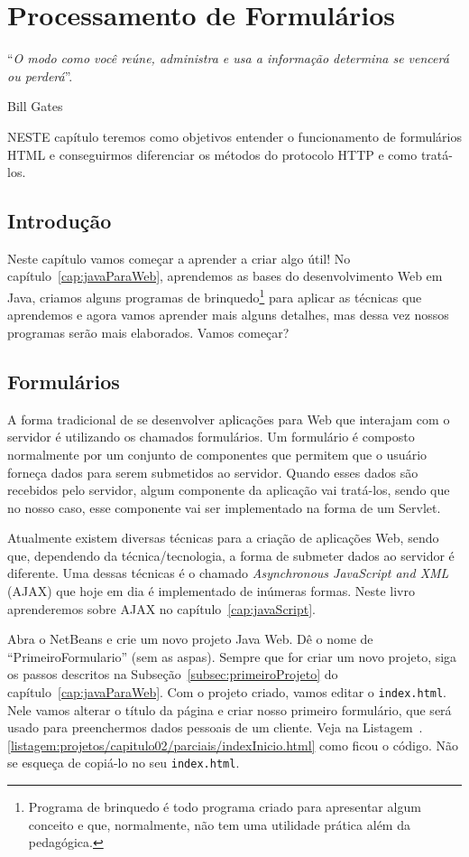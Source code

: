 \chapter{Processamento de Formulários}\label{cap:processamentoFormularios}
\epigraph{``\textit{O modo como você reúne, administra e usa a informação determina se vencerá ou perderá}''.}{Bill Gates}

\lettrine[lines=4, lhang=0.1, lraise=0, loversize=0.2, findent=0.1em]{\textcolor{corTema}{N}}{ESTE} capítulo teremos como objetivos entender o funcionamento de formulários HTML e conseguirmos diferenciar os métodos do protocolo HTTP e como tratá-los.


\section{Introdução}

Neste capítulo vamos começar a aprender a criar algo útil! No capítulo~\ref{cap:javaParaWeb}, aprendemos as bases do desenvolvimento Web em Java, criamos alguns programas de brinquedo\footnote{Programa de brinquedo é todo programa criado para apresentar algum conceito e que, normalmente, não tem uma utilidade prática além da pedagógica.} para aplicar as técnicas que aprendemos e agora vamos aprender mais alguns detalhes, mas dessa vez nossos programas serão mais elaborados. Vamos começar?


\section{Formulários}

A forma tradicional de se desenvolver aplicações para Web que interajam com o servidor é utilizando os chamados formulários. Um formulário é composto normalmente por um conjunto de componentes que permitem que o usuário forneça dados para serem submetidos ao servidor. Quando esses dados são recebidos pelo servidor, algum componente da aplicação vai tratá-los, sendo que no nosso caso, esse componente vai ser implementado na forma de um Servlet.

Atualmente existem diversas técnicas para a criação de aplicações Web, sendo que, dependendo da técnica/tecnologia, a forma de submeter dados ao servidor é diferente. Uma dessas técnicas é o chamado \textit{Asynchronous JavaScript and XML} (AJAX) que hoje em dia é implementado de inúmeras formas. Neste livro aprenderemos sobre AJAX no capítulo~\ref{cap:javaScript}.

Abra o NetBeans e crie um novo projeto Java Web. Dê o nome de ``PrimeiroFormulario'' (sem as aspas). Sempre que for criar um novo projeto, siga os passos descritos na Subseção~\ref{subsec:primeiroProjeto} do capítulo~\ref{cap:javaParaWeb}. Com o projeto criado, vamos editar o \texttt{index.html}. Nele vamos alterar o título da página e criar nosso primeiro formulário, que será usado para preenchermos dados pessoais de um cliente. Veja na Listagem~\thechapter.\ref{listagem:projetos/capitulo02/parciais/indexInicio.html} como ficou o código. Não se esqueça de copiá-lo no seu \texttt{index.html}.

